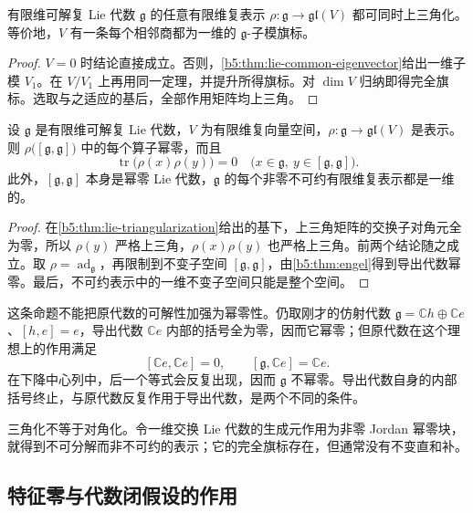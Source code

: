 \begin{theorem}\label{b5:thm:lie-triangularization}
	有限维可解复 Lie 代数 \(\mathfrak g\) 的任意有限维复表示 \(\rho:\mathfrak g\rightarrow\mathfrak{gl}(V)\) 都可同时上三角化。等价地，\(V\) 有一条每个相邻商都为一维的 \(\mathfrak g\)-子模旗标。
\end{theorem}
\begin{proof}
	\(V=0\) 时结论直接成立。否则，\cref{b5:thm:lie-common-eigenvector}给出一维子模 \(V_1\)。在 \(V/V_1\) 上再用同一定理，并提升所得旗标。对 \(\dim V\) 归纳即得完全旗标。选取与之适应的基后，全部作用矩阵均上三角。
\end{proof}

\begin{proposition}\label{b5:prop:solvable-derived-nilpotent}
	设 \(\mathfrak g\) 是有限维可解复 Lie 代数，\(V\) 为有限维复向量空间，\(\rho:\mathfrak g\to\mathfrak{gl}(V)\) 是表示。则 \(\rho\bigl([\mathfrak g,\mathfrak g]\bigr)\) 中的每个算子幂零，而且
	\[
		\operatorname{tr}\bigl(\rho(x)\rho(y)\bigr)=0 \quad\bigl(x\in\mathfrak g,\ y\in[\mathfrak g,\mathfrak g]\bigr).
	\]
	此外，\([\mathfrak g,\mathfrak g]\) 本身是幂零 Lie 代数，\(\mathfrak g\) 的每个非零不可约有限维复表示都是一维的。
\end{proposition}
\begin{proof}
	在\cref{b5:thm:lie-triangularization}给出的基下，上三角矩阵的交换子对角元全为零，所以 \(\rho(y)\) 严格上三角，\(\rho(x)\rho(y)\) 也严格上三角。前两个结论随之成立。取 \(\rho=\operatorname{ad}_{\mathfrak g}\)，再限制到不变子空间 \([\mathfrak g,\mathfrak g]\)，由\cref{b5:thm:engel}得到导出代数幂零。最后，不可约表示中的一维不变子空间只能是整个空间。
\end{proof}

这条命题不能把原代数的可解性加强为幂零性。仍取刚才的仿射代数 \(\mathfrak g=\mathbb Ch\oplus\mathbb Ce\)、\([h,e]=e\)，导出代数 \(\mathbb Ce\) 内部的括号全为零，因而它幂零；但原代数在这个理想上的作用满足
\[
	[\mathbb Ce,\mathbb Ce]=0,\qquad [\mathfrak g,\mathbb Ce]=\mathbb Ce.
\]
在下降中心列中，后一个等式会反复出现，因而 \(\mathfrak g\) 不幂零。导出代数自身的内部括号终止，与原代数反复作用于导出代数，是两个不同的条件。

\ProseParagraphBreak

三角化不等于对角化。令一维交换 Lie 代数的生成元作用为非零 Jordan 幂零块，就得到不可分解而非不可约的表示；它的完全旗标存在，但通常没有不变直和补。

\subsection{特征零与代数闭假设的作用}
\label{b5:subsec:1202:03}

